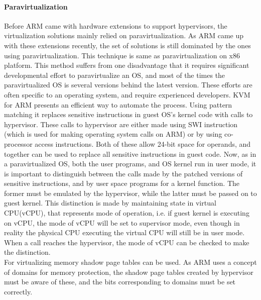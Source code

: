 \documentclass[seminar,twoside]{iitbreport}
\begin{document}
  
  
  \paragraph{Paravirtualization}
  
  Before ARM came with hardware extensions to support hypervisors, the virtualization solutions mainly relied on paravirtualization. As ARM came up with these 
  extensions recently, the set of solutions is still dominated by the ones using paravirtualization. This technique is same as paravirtualization
  on x86 platform. This method suffers from one disadvantage that it requires significant developmental effort to paravirtualize an OS, and most of the times the
  paravirtualized OS is several versions behind the latest version. These efforts are often specific to an operating system, and require experienced developers.
  KVM for ARM \cite{KVM-for-ARM} presents an efficient way to automate the process. Using pattern matching it replaces sensitive instructions in guest OS's kernel
  code with calls to hypervisor. These calls to hypervisor are either made using SWI instruction (which is used for making operating system calls on ARM) or by using co-processor
  access instructions. Both of these allow 24-bit space for operands, and together can be used to replace all sensitive instructions in guest code.
  Now, as in a paravirtualized OS, both the user programs, and OS kernel run in user mode, it is important to distinguish between the calls made by the patched versions of
  sensitive instructions, and by user space programs for a kernel function. The former must be emulated by the hypervisor, while the latter must be passed on to
  guest kernel. This distinction is made by maintaining state in virtual CPU(vCPU), that represents mode of operation, i.e. if guest kernel is executing on vCPU, the mode
  of vCPU will be set to supervisor mode, even though in reality the physical CPU executing the virtual CPU will still be in user mode. When a call reaches the
  hypervisor, the mode of vCPU can be checked to make the distinction.
  \\
  For virtualizing memory shadow page tables can be used. As ARM uses a concept of domains for memory protection, the shadow page tables created by hypervisor must be aware
  of these, and the bits corresponding to domains must be set correctly.
  
\end{document}
